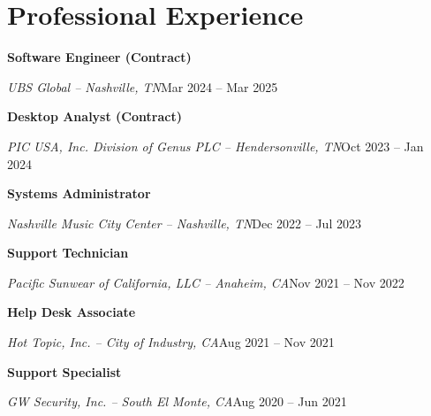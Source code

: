 \documentclass[a4paper]{article}
\begin{document}
\begin{minipage}[t]{0.38\textwidth}
  \raggedright
  \vspace*{0pt}
  \section{\appfirstname{} \applastname{}}

  \vspace{0.5em}
  \appsynopsis{}

  \vspace{1.5em}
  \vbox{
  }
\end{minipage}\hfill
\begin{minipage}[t]{0.60\textwidth}
  \raggedright
  \vspace*{0pt}

  \section{Professional Experience}
  \textbf{Software Engineer (Contract)}\par
  \textit{UBS Global -- Nashville, TN}\hfill Mar 2024 -- Mar 2025

  \vspace{0.5em}
  \textbf{Desktop Analyst (Contract)}\par
  \textit{PIC USA, Inc. Division of Genus PLC -- Hendersonville, TN}\hfill Oct 2023 -- Jan 2024

  \vspace{0.5em}
  \textbf{Systems Administrator}\par
  \textit{Nashville Music City Center -- Nashville, TN}\hfill Dec 2022 -- Jul 2023

  \vspace{0.5em}
  \textbf{Support Technician}\par
  \textit{Pacific Sunwear of California, LLC -- Anaheim, CA}\hfill Nov 2021 -- Nov 2022

  \vspace{0.5em}
  \textbf{Help Desk Associate}\par
  \textit{Hot Topic, Inc. -- City of Industry, CA}\hfill Aug 2021 -- Nov 2021

  \vspace{0.5em}
  \textbf{Support Specialist}\par
  \textit{GW Security, Inc. -- South El Monte, CA}\hfill Aug 2020 -- Jun 2021
\end{minipage}
\end{document}
